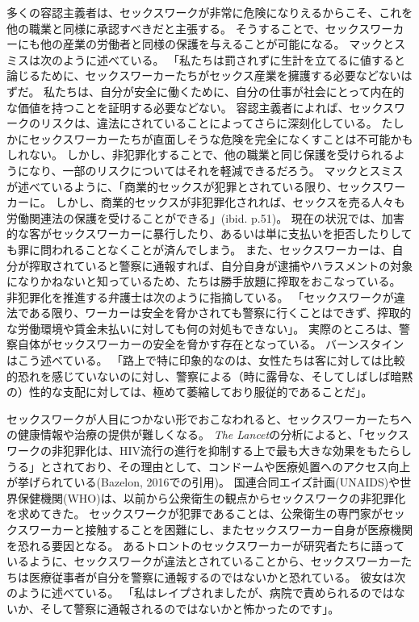 \documentclass[paper=a4,book,openany]{jlreq} \usepackage{mystyle}
\begin{document}
多くの容認主義者は、セックスワークが非常に危険になりえるからこそ、これを他の職業と同様に承認すべきだと主張する。
そうすることで、セックスワーカーにも他の産業の労働者と同様の保護を与えることが可能になる。
マックとスミスは次のように述べている。
「私たちは罰されずに生計を立てるに値すると論じるために、セックスワーカーたちがセックス産業を擁護する必要などないはずだ。
私たちは、自分が安全に働くために、自分の仕事が社会にとって内在的な価値を持つことを証明する必要などない\citep[p.55]{mac18:_revol_prost}。
容認主義者によれば、セックスワークのリスクは、違法にされていることによってさらに深刻化している。
たしかにセックスワーカーたちが直面しそうな危険を完全になくすことは不可能かもしれない。
しかし、非犯罪化することで、他の職業と同じ保護を受けられるようになり、一部のリスクについてはそれを軽減できるだろう。
マックとスミスが述べているように、「商業的セックスが犯罪とされている限り、セックスワーカーに。
しかし、商業的セックスが非犯罪化されれば、セックスを売る人々も労働関連法の保護を受けることができる」(ibid. p.51)。
現在の状況では、加害的な客がセックスワーカーに暴行したり、あるいは単に支払いを拒否したりしても罪に問われることなくことが済んでしまう。
また、セックスワーカーは、自分が搾取されていると警察に通報すれば、自分自身が逮捕やハラスメントの対象になりかねないと知っているため、たちは勝手放題に搾取をおこなっている。
非犯罪化を推進する弁護士は次のように指摘している。
「セックスワークが違法である限り、ワーカーは安全を脅かされても警察に行くことはできず、搾取的な労働環境や賃金未払いに対しても何の対処もできない」\citep{shugerman17:_prost_could_be_legal_calif}。
実際のところは、警察自体がセックスワーカーの安全を脅かす存在となっている。
バーンスタインはこう述べている。
「路上で特に印象的なのは、女性たちは客に対しては比較的恐れを感じていないのに対し、警察による（時に露骨な、そしてしばしば暗黙の）性的な支配に対しては、極めて萎縮しており服従的であることだ」\citep[p.108]{bernstein99:_whats_wrong_prost}。

セックスワークが人目につかない形でおこなわれると、セックスワーカーたちへの健康情報や治療の提供が難しくなる。
\emph{The Lancet}の分析によると、「セックスワークの非犯罪化は、HIV流行の進行を抑制する上で最も大きな効果をもたらしうる」とされており、その理由として、コンドームや医療処置へのアクセス向上が挙げられている(Bazelon, 2016での引用)。
\nocite{bazelon16:_shoul_prost_be_crime}
国連合同エイズ計画(UNAIDS)や世界保健機関(WHO)は、以前から公衆衛生の観点からセックスワークの非犯罪化を求めてきた。
セックスワークが犯罪であることは、公衆衛生の専門家がセックスワーカーと接触することを困難にし、またセックスワーカー自身が医療機関を恐れる要因となる。
あるトロントのセックスワーカーが研究者たちに語っているように、セックスワークが違法とされていることから、セックスワーカーたちは医療従事者が自分を警察に通報するのではないかと恐れている。
彼女は次のように述べている。
「私はレイプされましたが、病院で責められるのではないか、そして警察に通報されるのではないかと怖かったのです」\citep{neal14:_street_based_sex_worker_needs_asses}。
\end{document}
